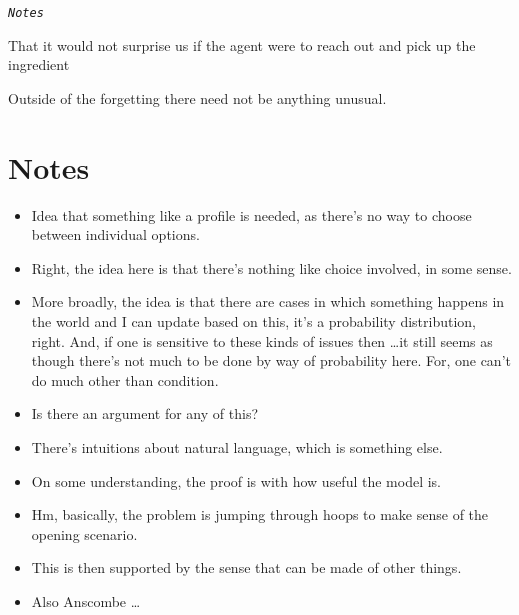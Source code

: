 \documentclass[10pt]{article}
\begin{document}
\newpage


\begin{center}
  {\color{red} \Huge \texttt{\emph{Notes}}}
\end{center}






That it would not surprise us if the agent were to reach out and pick up the ingredient 





Outside of the forgetting there need not be anything unusual.






\section*{Notes}

\begin{itemize}
\item Idea that something like a profile is needed, as there's no way to choose between individual options.
\item Right, the idea here is that there's nothing like choice involved, in some sense.
\item More broadly, the idea is that there are cases in which something happens in the world and I can update based on this, it's a probability distribution, right.
  And, if one is sensitive to these kinds of issues then \dots it still seems as though there's not much to be done by way of probability here.
  For, one can't do much other than condition.
\end{itemize}


\begin{itemize}
\item Is there an argument for any of this?
\item There's intuitions about natural language, which is something else.
\item On some understanding, the proof is with how useful the model is.
\item Hm, basically, the problem is jumping through hoops to make sense of the opening scenario.
\item This is then supported by the sense that can be made of other things.
\item Also Anscombe \dots
\end{itemize}

\newpage
\end{document}

